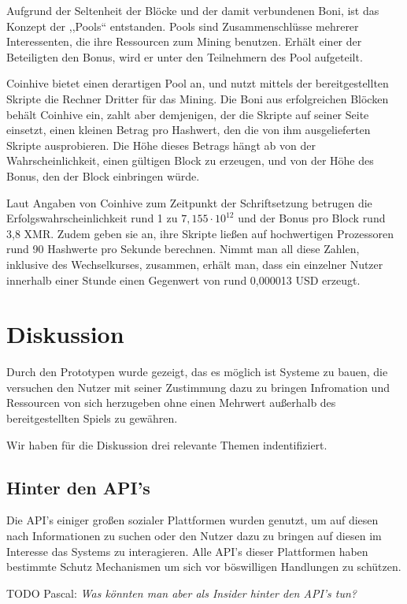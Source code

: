 \documentclass[german]{cgspaper} %
\newcommand{\todo}[1]{\textit{#1}}
\newcommand{\Pascal}[1]{\textcolor{colorPascal}{TODO Pascal:} \todo{#1} }
\begin{document}
Aufgrund der Seltenheit der Blöcke und der damit verbundenen Boni, ist das Konzept der ,,Pools`` entstanden.
Pools sind Zusammenschlüsse mehrerer Interessenten, die ihre Ressourcen zum Mining benutzen.
Erhält einer der Beteiligten den Bonus, wird er unter den Teilnehmern des Pool aufgeteilt.

Coinhive bietet einen derartigen Pool an, und nutzt mittels der bereitgestellten Skripte die Rechner Dritter für das Mining.
Die Boni aus erfolgreichen Blöcken behält Coinhive ein, zahlt aber demjenigen, der die Skripte auf seiner Seite einsetzt, einen kleinen Betrag pro Hashwert, den die von ihm ausgelieferten Skripte ausprobieren.
Die Höhe dieses Betrags hängt ab von der Wahrscheinlichkeit, einen gültigen Block zu erzeugen, und von der Höhe des Bonus, den der Block einbringen würde.

Laut Angaben von Coinhive zum Zeitpunkt der Schriftsetzung betrugen die Erfolgswahrscheinlichkeit rund 1 zu $7,155 \cdot 10^{12}$ und der Bonus pro Block rund 3,8 XMR.
Zudem geben sie an, ihre Skripte ließen auf hochwertigen Prozessoren rund 90 Hashwerte pro Sekunde berechnen.
Nimmt man all diese Zahlen, inklusive des Wechselkurses, zusammen, erhält man, dass ein einzelner Nutzer innerhalb einer Stunde einen Gegenwert von rund 0,000013 USD erzeugt.

\section{Diskussion}\label{sec:discussion}

Durch den Prototypen wurde gezeigt, das es möglich ist Systeme zu bauen, die versuchen den Nutzer mit seiner Zustimmung dazu zu bringen Infromation und Ressourcen von sich herzugeben ohne einen Mehrwert außerhalb des bereitgestellten Spiels zu gewähren.

Wir haben für die Diskussion drei relevante Themen indentifiziert.

\subsection{Hinter den API's}
Die API's einiger großen sozialer Plattformen wurden genutzt, um auf diesen nach Informationen zu suchen oder den Nutzer dazu zu bringen auf diesen im Interesse das Systems zu interagieren.
Alle API's dieser Plattformen haben bestimmte Schutz Mechanismen um sich vor böswilligen Handlungen zu schützen.

\Pascal{Was könnten man aber als Insider hinter den API's tun?}
\end{document}
